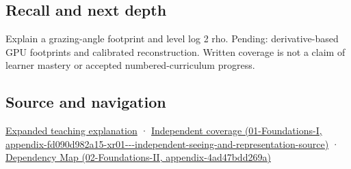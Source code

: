 \subsection{Recall and next depth}\label{appendix-b677a85ba76f-recall-and-next-depth}

Explain a grazing-angle footprint and level log 2 rho. Pending: derivative-based GPU footprints and calibrated reconstruction. Written coverage is not a claim of learner mastery or accepted numbered-curriculum progress.

\subsection{Source and navigation}\label{appendix-b677a85ba76f-source-and-navigation}

\href{Continuous\%20Notes/University\%20-\%20Worlds,\%20Images\%20and\%20Inference\%20-\%20Graphics,\%20Vision\%20and\%20Photography\#Multiresolution\%20work\%20must\%20preserve\%20the\%20right\%20information}{Expanded teaching explanation} · \href{../01-Foundations-I/main.pdf\#nameddest=appendix-fd090d982a15-xr01---independent-seeing-and-representation-source}{Independent coverage (01-Foundations-I, appendix-fd090d982a15-xr01-\/-\/-independent-seeing-and-representation-source)} · \href{../02-Foundations-II/main.pdf\#nameddest=appendix-4ad47bdd269a}{Dependency Map (02-Foundations-II, appendix-4ad47bdd269a)}
